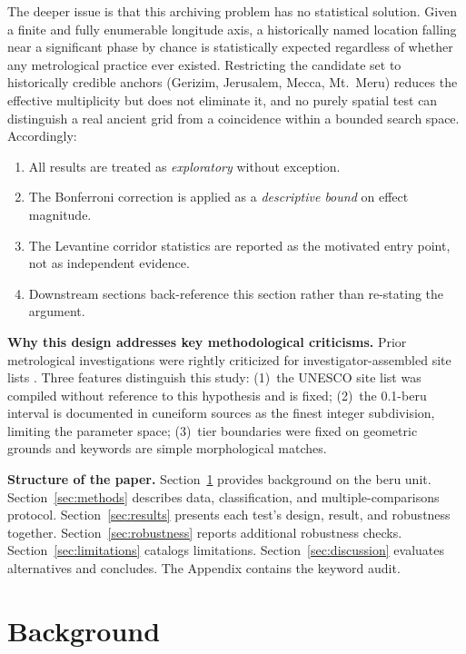 \documentclass[12pt,a4paper]{article}
\begin{document}
The deeper issue is that this archiving problem has no statistical solution.
Given a finite and fully enumerable longitude axis, a historically named
location falling near a significant phase by chance is statistically expected
regardless of whether any metrological practice ever existed. Restricting
the candidate set to historically credible anchors (Gerizim, Jerusalem,
Mecca, Mt.\ Meru) reduces the effective multiplicity but does not eliminate
it, and no purely spatial test can distinguish a real ancient grid from a
coincidence within a bounded search space.
Accordingly:
\begin{enumerate}[label=(\alph*)]
  \item All results are treated as \emph{exploratory} without exception.
  \item The Bonferroni correction is applied as a \emph{descriptive bound} on
    effect magnitude.
  \item The Levantine corridor statistics are reported as the motivated entry
    point, not as independent evidence.
  \item Downstream sections back-reference this section rather than re-stating
    the argument.
\end{enumerate}

\textbf{Why this design addresses key methodological criticisms.}
Prior metrological investigations were rightly criticized for investigator-assembled
site lists \citep{williamson1983leylines,freeman1976,kendall1974}.
Three features distinguish this study: (1)~the UNESCO site list was compiled
without reference to this hypothesis and is fixed; (2)~the 0.1-beru interval
is documented in cuneiform sources \citep{hunger2019mul} as the finest
integer subdivision, limiting the parameter space; (3)~tier boundaries
were fixed on geometric grounds and keywords are simple morphological matches.

\textbf{Structure of the paper.}
Section~\ref{sec:prior} provides background on the beru unit.
Section~\ref{sec:methods} describes data, classification, and multiple-comparisons protocol.
Section~\ref{sec:results} presents each test's design, result, and robustness together.
Section~\ref{sec:robustness} reports additional robustness checks.
Section~\ref{sec:limitations} catalogs limitations.
Section~\ref{sec:discussion} evaluates alternatives and concludes.
The Appendix contains the keyword audit.

\section{Background}
\label{sec:prior}
\end{document}
